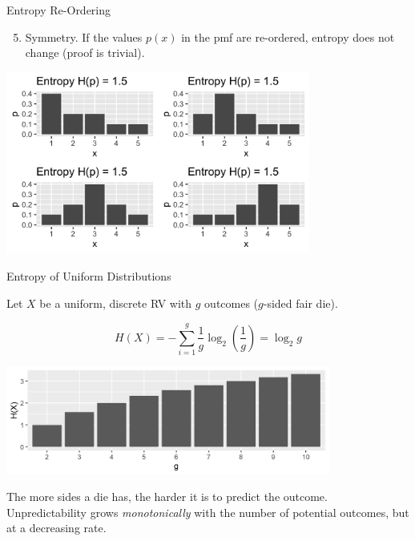 \documentclass[11pt,compress,t,notes=noshow, xcolor=table]{beamer}
\begin{document}
\begin{vbframe}{Entropy Re-Ordering}

\begin{enumerate}
\setcounter{enumi}{4}
   \item Symmetry. If the values $p(x)$ in the pmf are re-ordered, entropy does not change (proof is trivial).
\end{enumerate}
    
\begin{center}
\includegraphics[width = 10cm ]{figure/entropy_plot_reordering.png} \\
\end{center}

\end{vbframe}
  
\begin{vbframe}{Entropy of Uniform Distributions}

Let $X$ be a uniform, discrete RV with $g$ outcomes ($g$-sided fair die).

$$H(X) = - \sum_{i=1}^g \frac{1}{g} \log_2 \left(\frac{1}{g}\right) = \log_2 g$$

\vspace{0.2cm}
\begin{center}
\includegraphics[width = 0.8\textwidth]{figure/entropy_uniform_plot.png}
\end{center}

The more sides a die has, the harder it is to predict the outcome. 
Unpredictability grows \textit{monotonically} with the number of potential outcomes, but at a decreasing rate.
\end{vbframe}
\end{document}
